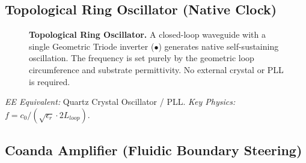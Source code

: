 \subsection{Topological Ring Oscillator (Native Clock)}
\label{sym:ring_oscillator}

\begin{figure}[ht]
\centering
{}
\caption{\textbf{Topological Ring Oscillator.} A closed-loop waveguide with a single Geometric Triode inverter ({\color{red!80!black}$\bullet$}) generates native self-sustaining oscillation. The frequency is set purely by the geometric loop circumference and substrate permittivity. No external crystal or PLL is required.}
\label{fig:sym_ring_osc}
\end{figure}

\noindent\textit{EE Equivalent:} Quartz Crystal Oscillator / PLL. \quad\textit{Key Physics:} $f = c_0 / (\sqrt{\epsilon_r} \cdot 2L_{loop})$.

\subsection{Coanda Amplifier (Fluidic Boundary Steering)}
\label{sym:coanda}

